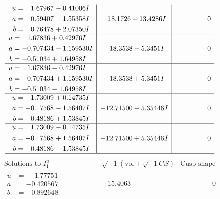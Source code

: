 \documentclass[1p]{elsarticle_modified}
\theoremstyle{definition}
\newcommand{\I}{\sqrt{-1}}
\begin{document}
$$\begin{array}{c|c|c}
\begin{aligned}
u &= \phantom{-}1.67967 - 0.41006 I \\
a &= \phantom{-}0.59407 - 1.55358 I \\
b &= \phantom{-}0.76478 + 2.07350 I\end{aligned}
 & \phantom{-}18.1726 + 13.4286 I & \phantom{-0.000000 } 0 \\ \hline\begin{aligned}
u &= \phantom{-}1.67836 + 0.42976 I \\
a &= -0.707434 - 1.159530 I \\
b &= -0.51034 + 1.64958 I\end{aligned}
 & \phantom{-}18.3538 - 5.3451 I & \phantom{-0.000000 } 0 \\ \hline\begin{aligned}
u &= \phantom{-}1.67836 - 0.42976 I \\
a &= -0.707434 + 1.159530 I \\
b &= -0.51034 - 1.64958 I\end{aligned}
 & \phantom{-}18.3538 + 5.3451 I & \phantom{-0.000000 } 0 \\ \hline\begin{aligned}
u &= \phantom{-}1.73009 + 0.14735 I \\
a &= -0.17568 - 1.56407 I \\
b &= -0.48186 + 1.53845 I\end{aligned}
 & -12.71500 - 5.35446 I & \phantom{-0.000000 } 0 \\ \hline\begin{aligned}
u &= \phantom{-}1.73009 - 0.14735 I \\
a &= -0.17568 + 1.56407 I \\
b &= -0.48186 - 1.53845 I\end{aligned}
 & -12.71500 + 5.35446 I & \phantom{-0.000000 } 0\\
 \hline 
 \end{array}$$\newpage$$\begin{array}{c|c|c}  
\text{Solutions to }I^u_{1}& \I (\text{vol} + \sqrt{-1}CS) & \text{Cusp shape}\\
 \hline 
\begin{aligned}
u &= \phantom{-}1.77751\phantom{ +0.000000I} \\
a &= -0.420567\phantom{ +0.000000I} \\
b &= -0.892648\phantom{ +0.000000I}\end{aligned}
 & -15.4063\phantom{ +0.000000I} & \phantom{-0.000000 } 0 \\ \hline\begin{aligned}

\end{aligned}
\end{array}$$
\end{document}
